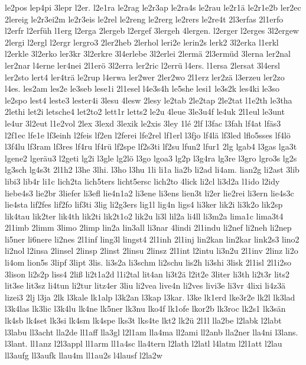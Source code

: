 {le2pos
lep4pi
3lepr
l2er.
l2e1ra
le2rag
le2r3ap
le2ra4s
le2rau
le2r1ä
le2r1e2b
ler2ec
2lereig
le2r3ei2m
le2r3eis
le2rel
le2reng
le2rerg
le2rers
le2re4t
2l3erfas
2l1erfo
l2erfr
l2erfüh
l1erg
l2erga
2lergeb
l2ergef
3lergeh
4lergen.
l2erger
l2erges
3l2ergew
2lergi
l2ergl
l2ergr
lergro3
2ler2heb
2lerhol
leri2e
lerin2s
lerk2
3l2erka
l1erkl
l2erkle
3l2erko
ler3kr
3l2erkre
3l4erlebe
3l2erlei
2lermä
2l3ermüd
3lerna
ler2nal
ler2nar
l4erne
ler4nei
2l1erö
3l2erra
ler2ric
l2errü
l4ers.
l1ersa
2lersat
3l4ersl
ler2sto
lert4
ler4trä
le2rup
l4erwa
ler2wer
2ler2wo
2l1erz
ler2zä
l3erzeu
ler2zo
l4es.
les2am
les2e
le3seb
lese1i
2l1esel
l4e3s4h
le5she
lesi1
le3s2k
les4ki
le3so
le2spo
lest4
leste3
lester4i
3lesu
4lesw
2lesy
le2tab
2le2tap
2le2tat
l1e2th
le3tha
2lethi
let2i
letsche4
let2to2
lett1r
letts2
le2u
4leue
3le3u4f
le4uk
2l1eul
le3unt
le4ur
3l2eut
l1e2vol
2lex
3lexd
3lexik
le2xis
3ley
1lé
2lf
l3fac
l3fah
lf4at
lfäs3
l2f1ec
lfe1e
lf3einh
l2feis
lf2en
l2ferei
lfe2rel
lf1erl
l3fjo
lf4lä
lf3led
lflo5sses
lf4lö
l3f4lu
lf3ram
lf3res
lf4ru
lf4rü
lf2spe
lf2s3ti
lf2su
lfun2
lfur1
2lg
lgab4
l3gas
lga3t
lgene2
lgeräu3
l2geti
lg2i
l3gle
lg2lö
l3go
lgoa3
lg2p
l3g4ra
lg3re
l3gro
lgro3s
lg2s
lg3sch
lg4s3t
2l1h2
l3he
3lhi.
l3ho
l3hu
1li
li1a
lia2b
li2ad
li4am.
lian2g
li2ast
3lib
libi3
lib4r
li1c
lich2ta
lich5ters
licht5ersc
lich2to
4lick
li2cl
li3d2a
l1ido
l2idy
liebe4s3
lie2br
3liefer
li3efl
lie4n1a2
li3ene
li3ens
lien3t
li2er
lie2rei
li3ern
lie4s3c
lie4sta
lif2fes
lif2fo
lif3ti
3lig
li2g3ers
lig1l
lig4n
ligs4
li3ker
lik2i
li3k2o
lik2sp
lik4tau
lik2ter
lik4th
lik2ti
lik2t1o2
lik2u
li3l
lil2a
li4ll
li3m2a
lima1c
lima3t4
2l1imb
2limm
3limo
2limp
lin2a
lin3all
li3nar
4lindi
2l1indu
li2nef
li2neh
li2nep
li5ner
li6nere
li2nes
2l1inf
ling3l
lingst4
2l1inh
2l1inj
lin2kan
lin2kar
link2s3
lino2
li2nol
l2insa
2linsel
2linsp
2linst
2linsu
2linsz
2l1int
l2intu
li3n2u
2l1inv
2linz
li2o
li4om
lion5s
3lipf
3lipt
3lis.
li3s2a
li3schm
li2schu
lis2h
li3shi
3lisk
2l1isl
2l1i2so
3lison
li2s2p
liss4
2liß
li2t1a2d
l1i2tal
lit4an
li3t2ä
l2it2e
3liter
li3th
li2t3r
lits2
lit3se
lit3sz
li4tun
li2tur
litz4er
3liu
li2vea
live4n
li2ves
livi3e
li3vr
4lixi
li4z3ä
lizei3
2lj
l3ja
2lk
l3kale
lk1alp
l3k2an
l3kap
l3kar.
l3ke
lk1erd
lke3r2e
lk2l
lk3lad
l3k4las
lk3lic
l3k4lu
lk4ne
lk5ner
lk3nu
lko4f
lk1ofe
lkor2b
lk3roc
lk2s1
lk3sän
lk4sb
lk4set
lk3si
lk4sm
lk4spe
lks3t
lks4te
lkt2
lk2ü
2l1l
lla2be
l2labk
l2labt
l3labu
ll3acht
lla2de
ll1aff
lla3gl
l2l1am
lla4ma
ll2ami
ll2anb
lla2ner
lla4ni
l3lans.
l3lant.
ll1anz
l2l3appl
ll1arm
ll1a4sc
lla4tern
l2lath
l2latl
l4latm
l2l1att
l2lau
ll3aufg
ll3aufk
llau4m
ll1au2s
l4lausf
l2la2w
}
